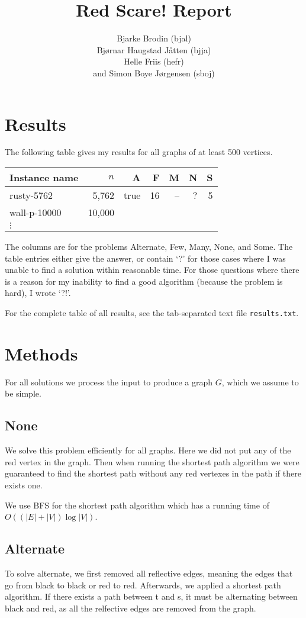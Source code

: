 \documentclass{tufte-handout}
\title{Red Scare! Report}
\author{
  Bjarke Brodin (bjal)\\
  Bjørnar Haugstad Jåtten (bjja)\\
  Helle Friis (hefr)\\
  and Simon Boye Jørgensen (sboj)
}
\begin{document}
\maketitle

\section{Results}

The following table gives my results for all graphs of at least 500 vertices.

\medskip
\begin{tabular}{lrrrrrr}
  \toprule
  Instance name & $n$ & A & F & M & N & S \\
  \midrule
  rusty-5762 & 5,762 & true & 16 & -- & ? & 5 \\
  wall-p-10000 & 10,000 &\\	
  $\vdots$\\
  \bottomrule
\end{tabular}
\medskip

The columns are for the problems Alternate, Few, Many, None, and Some.
The table entries either give the answer, or contain `?' for those cases where I was unable to find a solution within reasonable time.
For those questions where there is a reason for my inability to find a good algorithm (because the problem is hard), I wrote `?!'.

For the complete table of all results, see the tab-separated text file {\tt results.txt}.

\section{Methods}

For all solutions we process the input to produce a graph $G$,
which we assume to be simple.

\subsection{None}
We solve this problem efficiently for all graphs.
Here we did not put any of the red vertex in the graph.
Then when running the shortest path algorithm we were guaranteed
to find the shortest path without any red vertexes in the path
if there exists one.

We use BFS for the shortest path algorithm which has a 
running time of $O((|E| + |V|) \log |V|)$.

\subsection{Alternate}
To solve alternate, we first removed all reflective edges, 
meaning the edges that go from black to black or red to red.
Afterwards, we applied a shortest path algorithm.
If there exists a path between t and s, it must be 
alternating between black and red, as all the relfective edges are removed from the graph.
\end{document}
